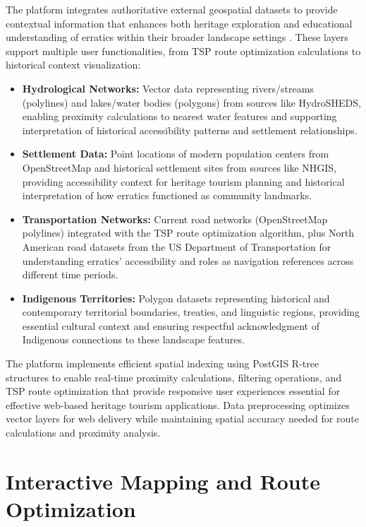 The platform integrates authoritative external geospatial datasets to provide contextual information that enhances both heritage exploration and educational understanding of erratics within their broader landscape settings \cite{Worboys2004}. These layers support multiple user functionalities, from TSP route optimization calculations to historical context visualization:
\begin{itemize}
    \item \textbf{Hydrological Networks:} Vector data representing rivers/streams (polylines) and lakes/water bodies (polygons) from sources like HydroSHEDS, enabling proximity calculations to nearest water features and supporting interpretation of historical accessibility patterns and settlement relationships.
    \item \textbf{Settlement Data:} Point locations of modern population centers from OpenStreetMap and historical settlement sites from sources like NHGIS, providing accessibility context for heritage tourism planning and historical interpretation of how erratics functioned as community landmarks.
    \item \textbf{Transportation Networks:} Current road networks (OpenStreetMap polylines) integrated with the TSP route optimization algorithm, plus North American road datasets from the US Department of Transportation for understanding erratics' accessibility and roles as navigation references across different time periods.
    \item \textbf{Indigenous Territories:} Polygon datasets representing historical and contemporary territorial boundaries, treaties, and linguistic regions, providing essential cultural context and ensuring respectful acknowledgment of Indigenous connections to these landscape features.
\end{itemize}
The platform implements efficient spatial indexing using PostGIS R-tree structures \cite{Guttman1984} to enable real-time proximity calculations, filtering operations, and TSP route optimization that provide responsive user experiences essential for effective web-based heritage tourism applications. Data preprocessing optimizes vector layers for web delivery while maintaining spatial accuracy needed for route calculations and proximity analysis.

\section{Interactive Mapping and Route Optimization}
\label{sec:interactive_mapping}

